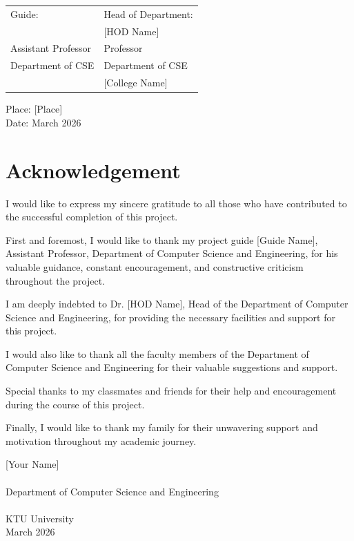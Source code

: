 \documentclass[12pt,a4paper]{report}
\begin{document}
\begin{center}
    \begin{tabular}{p{6cm}p{6cm}}
        \hline
        Guide: & Head of Department: \\
        [Guide Name] & [HOD Name] \\
        Assistant Professor & Professor \\
        Department of CSE & Department of CSE \\
        [College Name] & [College Name] \\
        \hline
    \end{tabular}
    
    \vspace{1cm}
    
    Place: [Place] \\
    Date: March 2026
    
\end{center}

\newpage

\chapter*{Acknowledgement}
\thispagestyle{empty}

\begin{singlespace}
I would like to express my sincere gratitude to all those who have contributed to the successful completion of this project.

First and foremost, I would like to thank my project guide [Guide Name], Assistant Professor, Department of Computer Science and Engineering, for his valuable guidance, constant encouragement, and constructive criticism throughout the project.

I am deeply indebted to Dr. [HOD Name], Head of the Department of Computer Science and Engineering, for providing the necessary facilities and support for this project.

I would also like to thank all the faculty members of the Department of Computer Science and Engineering for their valuable suggestions and support.

Special thanks to my classmates and friends for their help and encouragement during the course of this project.

Finally, I would like to thank my family for their unwavering support and motivation throughout my academic journey.

\vspace{1cm}

[Your Name] \\
[Roll Number] \\
Department of Computer Science and Engineering \\
[College Name] \\
KTU University \\
March 2026
\end{singlespace}
\end{document}
